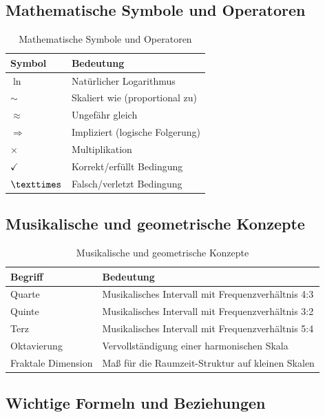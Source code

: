 	\subsection{Mathematische Symbole und Operatoren}
	
	\begin{table}[htbp]
		\centering
		\begin{tabular}{p{3cm}p{9cm}}
			\toprule
			\textbf{Symbol} & \textbf{Bedeutung} \\
			\midrule
			$\ln$ & Natürlicher Logarithmus \\
			$\sim$ & Skaliert wie (proportional zu) \\
			$\approx$ & Ungefähr gleich \\
			$\Rightarrow$ & Impliziert (logische Folgerung) \\
			$\times$ & Multiplikation \\
			$\checkmark$ & Korrekt/erfüllt Bedingung \\
			$\texttimes$ & Falsch/verletzt Bedingung \\
			\bottomrule
		\end{tabular}
		\caption{Mathematische Symbole und Operatoren}
	\end{table}
	
	\subsection{Musikalische und geometrische Konzepte}
	
	\begin{table}[htbp]
		\centering
		\begin{tabular}{p{3cm}p{9cm}}
			\toprule
			\textbf{Begriff} & \textbf{Bedeutung} \\
			\midrule
			Quarte & Musikalisches Intervall mit Frequenzverhältnis 4:3 \\
			Quinte & Musikalisches Intervall mit Frequenzverhältnis 3:2 \\
			Terz & Musikalisches Intervall mit Frequenzverhältnis 5:4 \\
			Oktavierung & Vervollständigung einer harmonischen Skala \\
			Fraktale Dimension & Maß für die Raumzeit-Struktur auf kleinen Skalen \\
			\bottomrule
		\end{tabular}
		\caption{Musikalische und geometrische Konzepte}
	\end{table}
	
	\subsection{Wichtige Formeln und Beziehungen}
	
